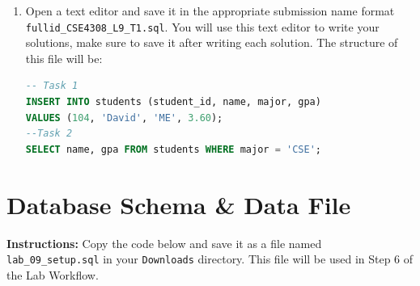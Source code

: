 \documentclass[12pt,a4paper]{article}
\begin{document}
\begin{enumerate}
After loading the SQL file, reconnect to PostgreSQL to verify that the tables have been created.

1. Reconnect to Your Database:

   \begin{lstlisting}[language=SQL]
   psql -h localhost -U student_12345 -d cse4308_12345
   \end{lstlisting}

2. Check Tables:

   Verify the tables have been created by listing them:

   \begin{lstlisting}[language=SQL]
   \dt
   \end{lstlisting}

3. View Table Data:

   Verify the data by running the following SQL queries:

   \begin{lstlisting}[language=SQL]
   SELECT * FROM <table_name>;
   \end{lstlisting}

\item Open a text editor and save it in the appropriate submission name format \\ \texttt{fullid\_CSE4308\_L9\_T1.sql}. You will use this text editor to write your solutions, make sure to save it after writing each solution. The structure of this file will be:
\begin{lstlisting}[language=SQL]
-- Task 1
INSERT INTO students (student_id, name, major, gpa)
VALUES (104, 'David', 'ME', 3.60);
--Task 2
SELECT name, gpa FROM students WHERE major = 'CSE';
\end{lstlisting}
\end{enumerate}

\section{Database Schema \& Data File}
\textbf{Instructions:} Copy the code below and save it as a file named \texttt{lab\_09\_setup.sql} in your \texttt{Downloads} directory. This file will be used in Step 6 of the Lab Workflow.
\end{document}
